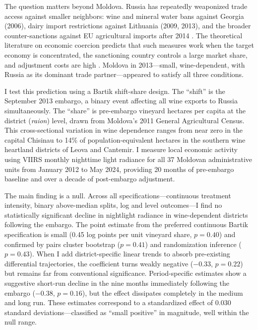 \documentclass[12pt]{article}
\begin{document}
The question matters beyond Moldova. Russia has repeatedly weaponized trade access against smaller neighbors: wine and mineral water bans against Georgia (2006), dairy import restrictions against Lithuania (2009, 2013), and the broader counter-sanctions against EU agricultural imports after 2014 \citep{drezner2003hidden, felbermayr2020economic}. The theoretical literature on economic coercion predicts that such measures work when the target economy is concentrated, the sanctioning country controls a large market share, and adjustment costs are high \citep{hufbauer2007economic}. Moldova in 2013---small, wine-dependent, with Russia as its dominant trade partner---appeared to satisfy all three conditions.

I test this prediction using a Bartik shift-share design. The ``shift'' is the September 2013 embargo, a binary event affecting all wine exports to Russia simultaneously. The ``share'' is pre-embargo vineyard hectares per capita at the district (\textit{raion}) level, drawn from Moldova's 2011 General Agricultural Census. This cross-sectional variation in wine dependence ranges from near zero in the capital Chisinau to 14\% of population-equivalent hectares in the southern wine heartland districts of Leova and Cantemir. I measure local economic activity using VIIRS monthly nighttime light radiance for all 37 Moldovan administrative units from January 2012 to May 2024, providing 20 months of pre-embargo baseline and over a decade of post-embargo adjustment.

The main finding is a null. Across all specifications---continuous treatment intensity, binary above-median splits, log and level outcomes---I find no statistically significant decline in nightlight radiance in wine-dependent districts following the embargo. The point estimate from the preferred continuous Bartik specification is small (0.45 log points per unit vineyard share, $p = 0.40$) and confirmed by pairs cluster bootstrap ($p = 0.41$) and randomization inference ($p = 0.43$). When I add district-specific linear trends to absorb pre-existing differential trajectories, the coefficient turns weakly negative ($-0.33$, $p = 0.22$) but remains far from conventional significance. Period-specific estimates show a suggestive short-run decline in the nine months immediately following the embargo ($-0.38$, $p = 0.16$), but the effect dissipates completely in the medium and long run. These estimates correspond to a standardized effect of 0.030 standard deviations---classified as ``small positive'' in magnitude, well within the null range.
\end{document}
